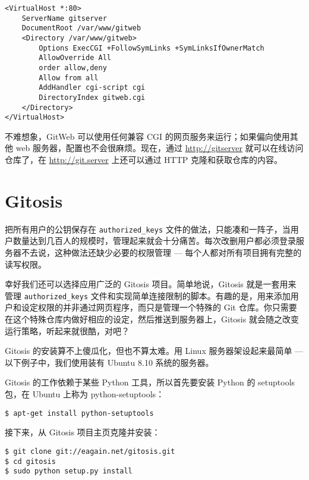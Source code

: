 \documentclass[a4paper]{book}
\begin{document}
\begin{shaded}\begin{verbatim}
<VirtualHost *:80>
    ServerName gitserver
    DocumentRoot /var/www/gitweb
    <Directory /var/www/gitweb>
        Options ExecCGI +FollowSymLinks +SymLinksIfOwnerMatch
        AllowOverride All
        order allow,deny
        Allow from all
        AddHandler cgi-script cgi
        DirectoryIndex gitweb.cgi
    </Directory>
</VirtualHost>
\end{verbatim}\end{shaded}

不难想象，GitWeb 可以使用任何兼容 CGI 的网页服务来运行；如果偏向使用其他 web 服务器，配置也不会很麻烦。现在，通过 \url{http://gitserver} 就可以在线访问仓库了，在 \url{http://git.server} 上还可以通过 HTTP 克隆和获取仓库的内容。

\section{Gitosis}

把所有用户的公钥保存在 \texttt{authorized\_keys} 文件的做法，只能凑和一阵子，当用户数量达到几百人的规模时，管理起来就会十分痛苦。每次改删用户都必须登录服务器不去说，这种做法还缺少必要的权限管理 --- 每个人都对所有项目拥有完整的读写权限。

幸好我们还可以选择应用广泛的 Gitosis 项目。简单地说，Gitosis 就是一套用来管理 \texttt{authorized\_keys} 文件和实现简单连接限制的脚本。有趣的是，用来添加用户和设定权限的并非通过网页程序，而只是管理一个特殊的 Git 仓库。你只需要在这个特殊仓库内做好相应的设定，然后推送到服务器上，Gitosis 就会随之改变运行策略，听起来就很酷，对吧？

Gitosis 的安装算不上傻瓜化，但也不算太难。用 Linux 服务器架设起来最简单 --- 以下例子中，我们使用装有 Ubuntu 8.10 系统的服务器。

Gitosis 的工作依赖于某些 Python 工具，所以首先要安装 Python 的 setuptools 包，在 Ubuntu 上称为 python-setuptools：

\begin{shaded}\begin{verbatim}
$ apt-get install python-setuptools
\end{verbatim}\end{shaded}

接下来，从 Gitosis 项目主页克隆并安装：

\begin{shaded}\begin{verbatim}
$ git clone git://eagain.net/gitosis.git
$ cd gitosis
$ sudo python setup.py install
\end{verbatim}\end{shaded}
\end{document}
